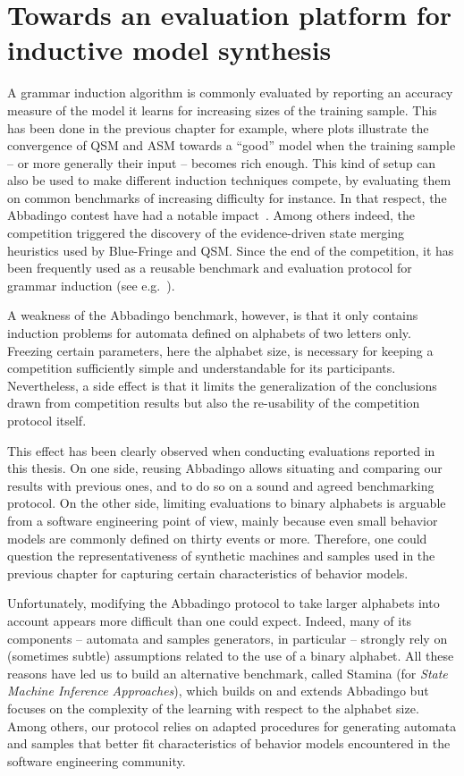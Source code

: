 \chapter{Towards an evaluation platform for inductive model synthesis\label{chapter:stamina}}

A grammar induction algorithm is commonly evaluated by reporting an accuracy measure of the model it learns for increasing sizes of the training sample. This has been done in the previous chapter for example, where plots illustrate the convergence of QSM and ASM towards a ``good'' model when the training sample -- or more generally their input -- becomes rich enough. This kind of setup can also be used to make different induction techniques compete, by evaluating them on common benchmarks of increasing difficulty for instance. In that respect, the Abbadingo contest have had a notable impact~\cite{Lang:1998}. Among others indeed, the competition triggered the discovery of the evidence-driven state merging heuristics used by Blue-Fringe and QSM. Since the end of the competition, it has been frequently used as a reusable benchmark and evaluation protocol for grammar induction (see e.g.~\cite{Lucas:2003, Bongard:2005, Lucas:2005, Adriaans:2006, Dupont:2008, Lambeau:2008, Heule:2010}).

A weakness of the Abbadingo benchmark, however, is that it only contains induction problems for automata defined on alphabets of two letters only. Freezing certain parameters, here the alphabet size, is necessary for keeping a competition sufficiently simple and understandable for its participants. Nevertheless, a side effect is that it limits the generalization of the conclusions drawn from competition results but also the re-usability of the competition protocol itself. 

This effect has been clearly observed when conducting evaluations reported in this thesis. On one side, reusing Abbadingo allows situating and comparing our results with previous ones, and to do so on a sound and agreed benchmarking protocol. On the other side, limiting evaluations to binary alphabets is arguable from a software engineering point of view, mainly because even small behavior models are commonly defined on thirty events or more. Therefore, one could question the representativeness of synthetic machines and samples used in the previous chapter for capturing certain characteristics of behavior models. 

Unfortunately, modifying the Abbadingo protocol to take larger alphabets into account appears more difficult than one could expect. Indeed, many of its components -- automata and samples generators, in particular -- strongly rely on (sometimes subtle) assumptions related to the use of a binary alphabet. All these reasons have led us to build an alternative benchmark, called Stamina (for \emph{State Machine Inference Approaches}), which builds on and extends Abbadingo but focuses on the complexity of the learning with respect to the alphabet size. Among others, our protocol relies on adapted procedures for generating automata and samples that better fit characteristics of behavior models encountered in the software engineering community.

